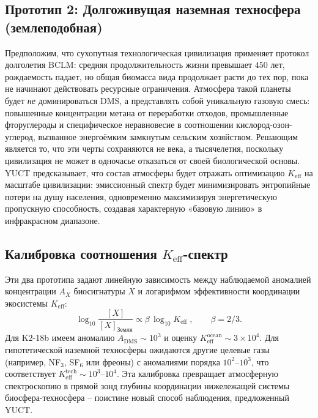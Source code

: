 \documentclass[11pt,a4paper]{article}
\begin{document}
	\subsection{Прототип 2: Долгоживущая наземная техносфера (землеподобная)}
	Предположим, что сухопутная технологическая цивилизация применяет протокол долголетия BCLM: средняя продолжительность жизни превышает \(450\) лет, рождаемость падает, но общая биомасса вида продолжает расти до тех пор, пока не начинают действовать ресурсные ограничения. Атмосфера такой планеты будет \emph{не} доминироваться DMS, а представлять собой уникальную газовую смесь: повышенные концентрации метана от переработки отходов, промышленные фторуглероды и специфическое неравновесие в соотношении кислород-озон-углерод, вызванное энергоёмким замкнутым сельским хозяйством. Решающим является то, что эти черты сохраняются не века, а тысячелетия, поскольку цивилизация не может в одночасье отказаться от своей биологической основы. YUCT предсказывает, что состав атмосферы будет отражать оптимизацию \(K_{\mathrm{eff}}\) на масштабе цивилизации: эмиссионный спектр будет минимизировать энтропийные потери на душу населения, одновременно максимизируя энергетическую пропускную способность, создавая характерную «базовую линию» в инфракрасном диапазоне.
	
	\subsection{Калибровка соотношения \(K_{\mathrm{eff}}\)-спектр}
	Эти два прототипа задают линейную зависимость между наблюдаемой аномалией концентрации \(A_X\) биосигнатуры \(X\) и логарифмом эффективности координации экосистемы \(K_{\mathrm{eff}}\):
	\begin{equation}
		\log_{10} \frac{[X]}{[X]_{\mathrm{Земля}}} \propto
		\beta\,\log_{10} K_{\mathrm{eff}} \; , \qquad \beta = 2/3 .
	\end{equation}
	Для K2-18b имеем аномалию \(A_{\mathrm{DMS}} \sim 10^3\) и оценку \(K_{\mathrm{eff}}^{\mathrm{ocean}} \sim 3\times10^4\). Для гипотетической наземной техносферы ожидаются другие целевые газы (например, NF$_3$, SF$_6$ или фреоны) с аномалиями порядка \(10^2\)–\(10^3\), что соответствует \(K_{\mathrm{eff}}^{\mathrm{tech}} \sim 10^3\)–\(10^4\). Эта калибровка превращает атмосферную спектроскопию в прямой зонд глубины координации нижележащей системы биосфера-техносфера – поистине новый способ наблюдения, предложенный YUCT.
	
\end{document}
